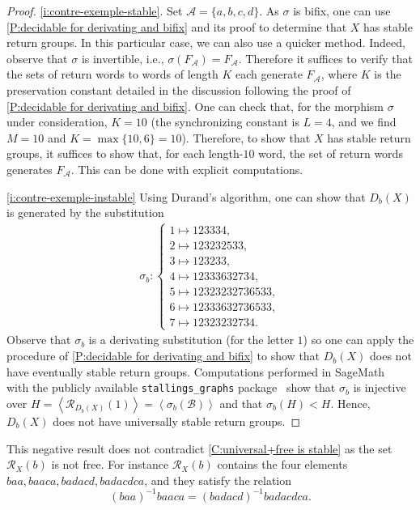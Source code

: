 \documentclass{amsart}
\newcommand*{\ret}{\mathcal{R}}
\newcommand*{\cA}{\mathcal{A}}
\newcommand*{\cB}{\mathcal{B}}
\newcommand*{\from}{\colon}
\newcommand{\displaysub}[1]{\begin{cases}#1\end{cases}}
\newcommand*{\gen}[1]{\left\langle #1\right\rangle}
\theoremstyle{plain}
\theoremstyle{definition}
\theoremstyle{remark}
\begin{document}
\begin{proof}
    \ref{i:contre-exemple-stable}. Set $\cA = \{a,b,c,d\}$. As $\sigma$ is bifix, one can use \cref{P:decidable for derivating and bifix} and its proof to determine that $X$ has stable return groups. In this particular case, we can also use a quicker method. Indeed, observe that $\sigma$ is invertible, i.e., $\sigma(F_\cA) = F_\cA$. Therefore it suffices to verify that the sets of return words to words of length $K$ each generate $F_\cA$, where $K$ is the preservation constant detailed in the discussion following the proof of \cref{P:decidable for derivating and bifix}. One can check that, for the morphism $\sigma$ under consideration, $K=10$ (the synchronizing constant is $L=4$, and we find $M=10$ and $K = \max\{10,6\}=10$). Therefore, to show that $X$ has stable return groups, it suffices to show that, for each length-$10$ word, the set of return words generates $F_\cA$. This can be done with explicit computations.
        
    \ref{i:contre-exemple-instable} Using Durand's algorithm, one can show that $D_b(X)$ is generated by the substitution
    \begin{align*}
        \sigma_b \from \displaysub{ 1\mapsto 123334, \\ 2\mapsto 123232533, \\ 3\mapsto 123233, \\ 4\mapsto 12333632734, \\ 5\mapsto 12323232736533, \\ 6\mapsto 12333632736533, \\ 7\mapsto 12323232734.}
    \end{align*}
    Observe that $\sigma_b$ is a derivating substitution (for the letter $1$) so one can apply the procedure of \cref{P:decidable for derivating and bifix} to show that $D_b(X)$ does not have eventually stable return groups. Computations performed in SageMath~\cite{man/Sage2022} with the publicly available \verb|stallings_graphs| package~\cite{man/stallings2019} show that $\sigma_b$ is injective over $H = \gen{\ret_{D_b(X)}(1)} = \gen{\sigma_b(\cB)}$ and that $\sigma_b(H) < H$. Hence, $D_b(X)$ does not have universally stable return groups.
\end{proof}

This negative result does not contradict \cref{C:universal+free is stable} as the set $\ret_{X}(b)$ is not free. For instance $\ret_X(b)$ contains the four elements $baa, baaca, badacd, badacdca$, and they satisfy the relation
\[
    (baa)^{-1} baaca = (badacd)^{-1}badacdca.
\]
\end{document}
